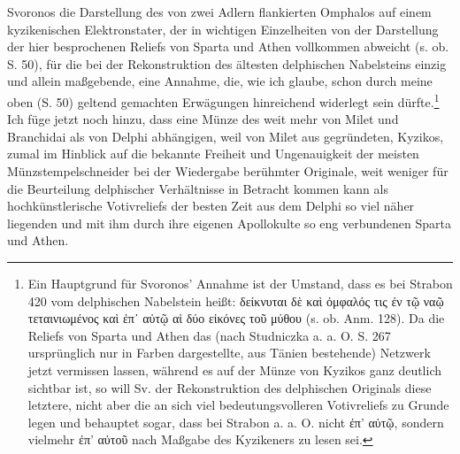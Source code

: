 \documentclass[a4paper, 11pt, oneside]{article}
\begin{document}
Svoronos die Darstellung des von zwei Adlern flankierten Omphalos auf einem kyzikenischen Elektronstater, der in wichtigen Einzelheiten von der Darstellung der hier besprochenen Reliefs von Sparta und Athen vollkommen abweicht (s. ob. S. 50), für die bei der Rekonstruktion des ältesten delphischen Nabelsteins einzig und allein maßgebende, eine Annahme, die, wie ich glaube, schon durch meine oben (S. 50) geltend gemachten Erwägungen hinreichend widerlegt sein dürfte.\footnote{Ein Hauptgrund für Svoronos' Annahme ist der Umstand, dass es bei Strabon 420 vom delphischen Nabelstein heißt: δείκνυται δὲ καὶ ὀμφαλός τις ἐν τῷ ναῷ τεταινιωμένος καὶ ἐπ᾿ αὐτῷ αἱ δύο εἰκόνες τοῦ μύθου (s. ob. Anm. 128). Da die Reliefs von Sparta und Athen das (nach Studniczka a. a. O. S. 267 ursprünglich nur in Farben dargestellte, aus Tänien bestehende) Netzwerk jetzt vermissen lassen, während es auf der Münze von Kyzikos ganz deutlich sichtbar ist, so will Sv. der Rekonstruktion des delphischen Originals diese letztere, nicht aber die an sich viel bedeutungsvolleren Votivreliefs zu Grunde legen und behauptet sogar, dass bei Strabon a. a. O. nicht ἐπ' αὐτῷ, sondern vielmehr ἐπ' αὐτοῦ nach Maßgabe des Kyzikeners zu lesen sei.} Ich füge jetzt noch hinzu, dass eine Münze des weit mehr von Milet und Branchidai als von Delphi abhängigen, weil von Milet aus gegründeten, Kyzikos, zumal im Hinblick auf die bekannte Freiheit und Ungenauigkeit der meisten Münzstempelschneider bei der Wiedergabe berühmter Originale, weit weniger für die Beurteilung delphischer Verhältnisse in Betracht kommen kann als hochkünstlerische Votivreliefs der besten Zeit aus dem Delphi so viel näher liegenden und mit ihm durch ihre eigenen Apollokulte so eng verbundenen Sparta und Athen.
\end{document}
